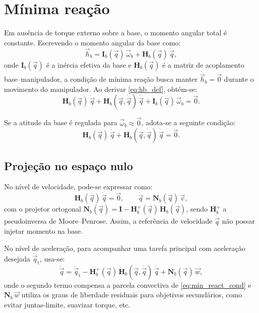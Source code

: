 \section{Mínima reação}
Em ausência de torque externo sobre a base, o momento angular total é constante.
Escrevendo o momento angular da base como:
\begin{equation}
\vec h_b
=
\mathbf I_b(\vec q)\,\vec\omega_b
+\mathbf H_b(\vec q)\,\dot{\vec q},
\label{eq:hb_def}
\end{equation}
onde $\mathbf I_b(\vec q)$ é a inércia efetiva da base e
$\mathbf H_b(\vec q)$ é a matriz de acoplamento base--manipulador,
a condição de mínima reação busca manter
$\dot{\vec h}_b=\vec 0$
durante o movimento do manipulador.
Ao derivar \eqref{eq:hb_def}, obtém-se:
\begin{equation}
\mathbf H_b(\vec q)\,\ddot{\vec q}
+\dot{\mathbf H}_b(\vec q,\dot{\vec q})\,\dot{\vec q}
+\mathbf I_b(\vec q)\,\dot{\vec\omega}_b
=
\vec 0.
\label{eq:hb_dot_zero}
\end{equation}

Se a atitude da base é regulada para $\vec\omega_b\!\approx\!\vec 0$,
adota-se a seguinte condição:
\begin{equation}
\mathbf H_b(\vec q)\,\ddot{\vec q}
+\dot{\mathbf H}_b(\vec q,\dot{\vec q})\,\dot{\vec q}
=
\vec 0.
\label{eq:min_react_cond}
\end{equation}

\subsection{Projeção no espaço nulo}
No nível de velocidade, pode-se expressar como:
\begin{equation}
\mathbf H_b(\vec q)\,\dot{\vec q}
=
\vec 0,
\qquad
\dot{\vec q}
=
\mathbf N_b(\vec q)\,\vec v,
\label{eq:vel_null}
\end{equation}
com o projetor ortogonal
$\mathbf N_b(\vec q)=\mathbf I-\mathbf H_b^{+}(\vec q)\,\mathbf H_b(\vec q)$,
sendo $\mathbf H_b^{+}$ a pseudoinversa de Moore--Penrose.
Assim, a referência de velocidade $\dot{\vec q}$ não possar injetar momento na base.

No nível de aceleração, para acompanhar uma tarefa principal com aceleração desejada
$\ddot{\vec q}_{\text{t}}$,
usa-se:
\begin{equation}
\ddot{\vec q}
=
\ddot{\vec q}_{\text{t}}
-\mathbf H_b^{+}(\vec q)\,\dot{\mathbf H}_b(\vec q,\dot{\vec q})\,\dot{\vec q}
+\mathbf N_b(\vec q)\,\vec w,
\label{eq:acc_null}
\end{equation}
onde o segundo termo compensa a parcela convectiva de
\eqref{eq:min_react_cond}
e $\mathbf N_b\,\vec w$
utiliza os graus de liberdade residuais para objetivos secundários, como evitar juntas-limite, suavizar torque, etc.


